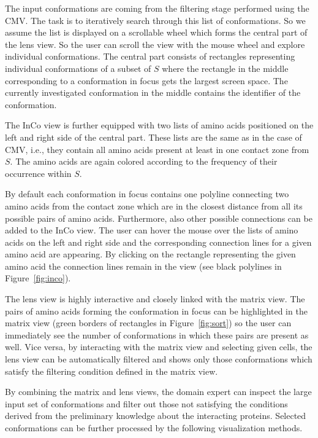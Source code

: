 \documentclass[journal]{vgtc}                %
\begin{document}
The input conformations are coming from the filtering stage performed using the CMV.
The task is to iteratively search through this list of conformations.
So we assume the list is displayed on a scrollable wheel which forms the central part of the lens view. 
So the user can scroll the view with the mouse wheel and explore individual conformations.
The central part consists of rectangles representing individual conformations of a subset of $S$ where the rectangle in the middle corresponding to a conformation in focus gets the largest screen space.
The currently investigated conformation in the middle contains the identifier of the conformation.

The InCo view is further equipped with two lists of amino acids positioned on the left and right side of the central part.
These lists are the same as in the case of CMV, i.e., they contain all amino acids present at least in one contact zone from $S$.
The amino acids are again colored according to the frequency of their occurrence within $S$.

By default each conformation in focus contains one polyline connecting two amino acids from the contact zone which are in the closest distance from all its possible pairs of amino acids.
Furthermore, also other possible connections can be added to the InCo view.
The user can hover the mouse over the lists of amino acids on the left and right side and the corresponding connection lines for a given amino acid are appearing.
By clicking on the rectangle representing the given amino acid the connection lines remain in the view (see black polylines in Figure~\ref{fig:inco}).

The lens view is highly interactive and closely linked with the matrix view.
The pairs of amino acids forming the conformation in focus can be highlighted in the matrix view (green borders of rectangles in Figure~\ref{fig:sort}) so the user can immediately see the number of conformations in which these pairs are present as well.
Vice versa, by interacting with the matrix view and selecting given cells, the lens view can be automatically filtered and shows only those conformations which satisfy the filtering condition defined in the matrix view.

By combining the matrix and lens views, the domain expert can inspect the large input set of conformations and filter out those not satisfying the conditions derived from the preliminary knowledge about the interacting proteins.
Selected conformations can be further processed by the following visualization methods.
\end{document}
